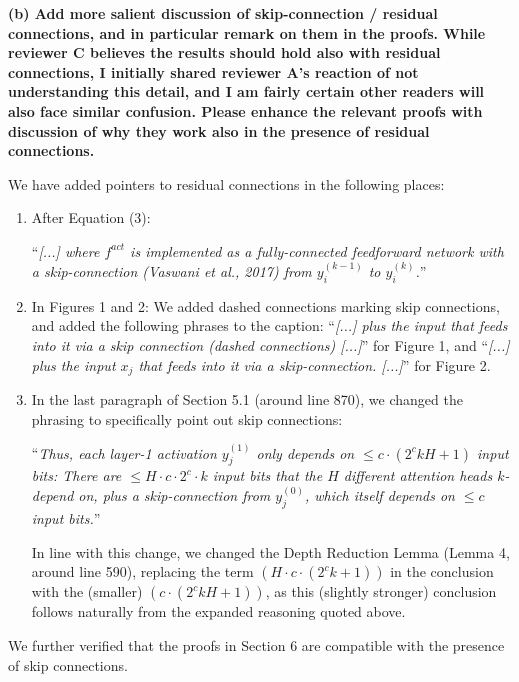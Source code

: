 \documentclass[11pt,a4paper]{article}
\newcommand\response[1]{{\color{blue}#1}}
\newcommand\newtext[1]{``\textit{#1}''}
\newcommand\original[1]{\textbf{#1}}
\begin{document}
\original{(b) Add more salient discussion of skip-connection / residual connections,
and in particular remark on them in the proofs. While reviewer C believes
the results should hold also with residual connections, I initially shared
reviewer A's reaction of not understanding this detail, and I am fairly
certain other readers will also face similar confusion. Please enhance the
relevant proofs with discussion of why they work also in the presence of
residual connections.}

\response{We have added pointers to residual connections in the following places:}


\begin{enumerate}
    \item \response{After Equation (3):}

\response{\newtext{[...] where $f^{act}$ is implemented as a fully-connected feedforward network with a skip-connection (Vaswani et al., 2017) from $y_i^{(k-1)}$ to $y_i^{(k)}$.}}
\newline

\item \response{In Figures 1 and 2: We added dashed connections marking skip connections, and added the following phrases to the caption: \newtext{[...] plus the input that feeds into it via a skip connection (dashed
connections) [...]} for Figure 1, and \newtext{[...] plus the input $x_j$ that feeds into it
via a skip-connection. [...]} for Figure 2.}
\newline

\item \response{In the last paragraph of Section 5.1 (around line 870), we changed the phrasing to specifically point out skip connections:}

\response{\newtext{Thus, each layer-1 activation $y_j^{(1)}$ only depends on $\leq c\cdot (2^ckH+1)$ input bits: There are $\leq H\cdot c \cdot 2^c \cdot k$ input bits that the $H$ different attention heads $k$-depend on, plus a skip-connection from $y_j^{(0)}$, which itself depends on $\leq c$ input bits.}}

\response{In line with this change, we changed the Depth Reduction Lemma (Lemma 4, around line 590), replacing the term $(H\cdot c\cdot(2^ck+1))$ in the conclusion with the (smaller) $( c\cdot(2^ckH+1))$, as this (slightly stronger) conclusion follows naturally from the expanded reasoning quoted above.}
\end{enumerate}


\response{We further verified that the proofs in Section 6 are compatible with the presence of skip connections.}
\end{document}
